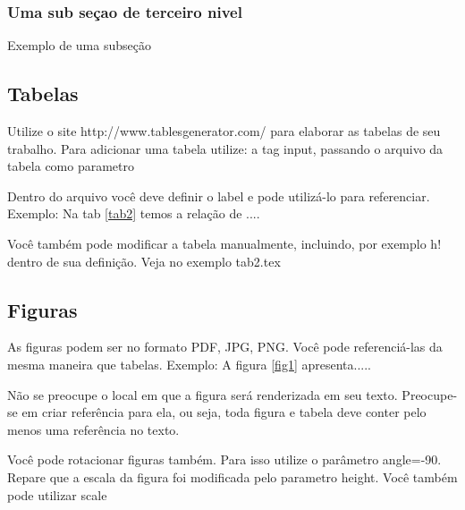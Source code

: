 \documentclass[	DIV=calc,%
							paper=a4,%
							fontsize=12pt,%
							onecolumn]{scrartcl}	 					%
\begin{document}
\subsubsection{Uma sub seçao de terceiro nivel}
Exemplo de uma subseção
\subsection{Tabelas}

Utilize o site http://www.tablesgenerator.com/ para elaborar as tabelas de seu trabalho.
Para adicionar uma tabela utilize: a tag input, passando o arquivo da tabela como parametro



Dentro do arquivo você deve definir o label e pode utilizá-lo para referenciar. Exemplo:
Na tab \ref{tab2} temos a relação de ....


Você também pode modificar a tabela manualmente, incluindo, por exemplo h! dentro de sua definição. Veja no exemplo tab2.tex

\subsection{Figuras}

As figuras podem ser no formato PDF, JPG, PNG. Você pode referenciá-las da mesma maneira que tabelas. Exemplo: A figura \ref{fig1} apresenta.....

Não se preocupe o local em que a figura será renderizada em seu texto. Preocupe-se em criar referência para ela, ou seja, toda figura e tabela deve conter pelo menos uma referência no texto.

Você pode rotacionar figuras também. Para isso utilize o parâmetro angle=-90. Repare que a escala da figura foi modificada pelo parametro height. Você também pode utilizar scale



\end{document}
